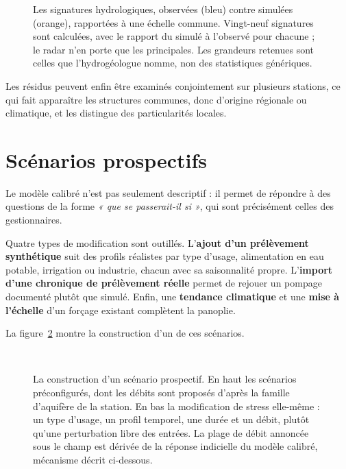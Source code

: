 \begin{figure}[htbp]
\centering
{}
\caption{Les signatures hydrologiques, observées (bleu) contre simulées (orange), rapportées à
une échelle commune. Vingt-neuf signatures sont calculées, avec le rapport du simulé à l'observé
pour chacune ; le radar n'en porte que les principales. Les grandeurs retenues sont celles que
l'hydrogéologue nomme, non des statistiques génériques.}
\label{fig:pastas-radar}
\end{figure}

Les résidus peuvent enfin être examinés conjointement sur plusieurs stations, ce qui fait apparaître les structures communes, donc d'origine régionale ou
climatique, et les distingue des particularités locales.

\section{Scénarios prospectifs}

Le modèle calibré n'est pas seulement descriptif : il permet de répondre à des questions de la
forme \emph{« que se passerait-il si »}, qui sont précisément celles des gestionnaires.

Quatre types de modification sont outillés. L'\textbf{ajout d'un prélèvement synthétique} suit
des profils réalistes par type d'usage, alimentation en eau potable, irrigation ou industrie,
chacun avec sa saisonnalité propre. L'\textbf{import d'une chronique de prélèvement réelle}
permet de rejouer un pompage documenté plutôt que simulé. Enfin, une \textbf{tendance climatique}
et une \textbf{mise à l'échelle} d'un forçage existant complètent la panoplie.

La figure~\ref{fig:scenario} montre la construction d'un de ces scénarios.

\begin{figure}[htbp]
\centering
{}\\[0.35em]
\caption{La construction d'un scénario prospectif. En haut les scénarios préconfigurés, dont les
débits sont proposés d'après la famille d'aquifère de la station. En bas la modification de
stress elle-même : un type d'usage, un profil temporel, une durée et un débit, plutôt qu'une
perturbation libre des entrées. La plage de débit annoncée sous le champ est dérivée de la
réponse indicielle du modèle calibré, mécanisme décrit ci-dessous.}
\label{fig:scenario}
\end{figure}

